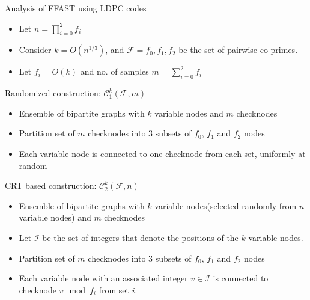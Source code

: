 \documentclass[10pt,xcolor=table]{beamer}
\begin{document}
	\begin{frame}{Analysis of FFAST using LDPC codes}
		\begin{itemize}
			\item Let $n=\prod_{i=0}^{2}f_i$
			\item Consider $k = O(n^{1/3})$, and $\mathcal{F}={f_0,f_1,f_2}$ be the set of pairwise co-primes.
			\item Let $f_i = O(k)$ and no. of samples $m = \sum_{i=0}^{2}f_i$			\end{itemize}
		
		\begin{block}{Randomized construction: {\color{blue} $\mathcal{C}_{1}^{k}(\mathcal{F},m)$}}
		\begin{itemize}
			\item Ensemble of bipartite graphs with $k$ variable nodes and $m$ checknodes
			\item Partition set of $m$ checknodes into 3 subsets of $f_0$, $f_1$ and $f_2$ nodes
			\item Each variable node is connected to one checknode from each set, uniformly at random
		\end{itemize}
		\end{block}
		
		\begin{block}{CRT based construction: {\color{blue} $\mathcal{C}_{2}^{k}(\mathcal{F},n)$}}
			\begin{itemize}
				\item Ensemble of bipartite graphs with $k$ variable nodes(selected randomly from $n$ variable nodes) and $m$ checknodes
				\item Let $\mathcal{I}$ be the set of integers that denote the positions of the $k$ variable nodes.
				\item Partition set of $m$ checknodes into 3 subsets of $f_0$, $f_1$ and $f_2$ nodes
				\item Each variable node with an associated integer $v \in \mathcal{I}$ is connected to checknode \alert{$v \mod f_i$} from set $i$.
			\end{itemize}
		\end{block}
		
	\end{frame}
\end{document}
